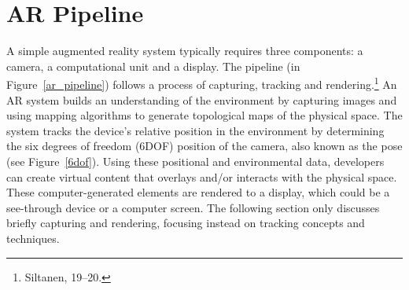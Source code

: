 \section{AR Pipeline}
A simple augmented reality system typically requires three components: a camera, a computational unit and a display. The pipeline (in Figure~\ref{ar_pipeline}) follows a process of capturing, tracking and rendering.\footnote{Siltanen, 19–20.} An AR system builds an understanding of the environment by capturing images and using mapping algorithms to generate topological maps of the physical space. The system tracks the device’s relative position in the environment by determining the six degrees of freedom (6DOF) position of the camera, also known as the pose (see Figure~\ref{6dof}). Using these positional and environmental data, developers can create virtual content that overlays and/or interacts with the physical space. These computer-generated elements are rendered to a display, which could be a see-through device or a computer screen. The following section only discusses briefly capturing and rendering, focusing instead on tracking concepts and techniques.

\begin{figure}[!ht]
\end{figure}

\begin{figure}[!ht]
\vspace{-.1 in}
\end{figure}

